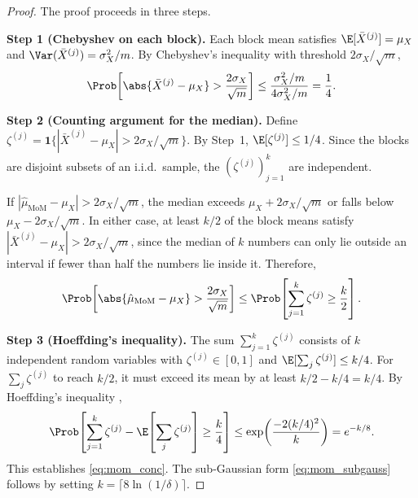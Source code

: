 \begin{proof}
The proof proceeds in three steps.

\medskip\noindent\textbf{Step 1 (Chebyshev on each block).} Each block mean satisfies $\E[\bar{X}^{(j)}] = \mu_X$ and $\Var(\bar{X}^{(j)}) = \sigma_X^2/m$. By Chebyshev's inequality with threshold $2\sigma_X/\sqrt{m}$,
\[
    \Prob\!\left[\abs{\bar{X}^{(j)} - \mu_X} > \frac{2\sigma_X}{\sqrt{m}}\right] \leq \frac{\sigma_X^2/m}{4\sigma_X^2/m} = \frac{1}{4}.
\]

\medskip\noindent\textbf{Step 2 (Counting argument for the median).} Define $\zeta^{(j)} = \mathbf{1}\{|\bar{X}^{(j)} - \mu_X| > 2\sigma_X/\sqrt{m}\}$. By Step~1, $\E[\zeta^{(j)}] \leq 1/4$. Since the blocks are disjoint subsets of an i.i.d.\ sample, the $(\zeta^{(j)})_{j=1}^{k}$ are independent.

If $|\hat{\mu}_{\mathrm{MoM}} - \mu_X| > 2\sigma_X/\sqrt{m}$, the median exceeds $\mu_X + 2\sigma_X/\sqrt{m}$ or falls below $\mu_X - 2\sigma_X/\sqrt{m}$. In either case, at least $k/2$ of the block means satisfy $|\bar{X}^{(j)} - \mu_X| > 2\sigma_X/\sqrt{m}$, since the median of $k$ numbers can only lie outside an interval if fewer than half the numbers lie inside it. Therefore,
\[
    \Prob\!\left[\abs{\hat{\mu}_{\mathrm{MoM}} - \mu_X} > \frac{2\sigma_X}{\sqrt{m}}\right] \leq \Prob\!\left[\sum_{j=1}^{k} \zeta^{(j)} \geq \frac{k}{2}\right].
\]

\medskip\noindent\textbf{Step 3 (Hoeffding's inequality).} The sum $\sum_{j=1}^{k}\zeta^{(j)}$ consists of $k$ independent random variables with $\zeta^{(j)} \in [0,1]$ and $\E[\sum_j \zeta^{(j)}] \leq k/4$. For $\sum_j \zeta^{(j)}$ to reach $k/2$, it must exceed its mean by at least $k/2 - k/4 = k/4$. By Hoeffding's inequality \citep{hoeffding1963probability},
\[
    \Prob\!\left[\sum_{j=1}^{k} \zeta^{(j)} - \E\!\left[\sum_j \zeta^{(j)}\right] \geq \frac{k}{4}\right] \leq \exp\!\left(\frac{-2(k/4)^2}{k}\right) = e^{-k/8}.
\]
This establishes \eqref{eq:mom_conc}. The sub-Gaussian form \eqref{eq:mom_subgauss} follows by setting $k = \lceil 8\ln(1/\delta)\rceil$.
\end{proof}

